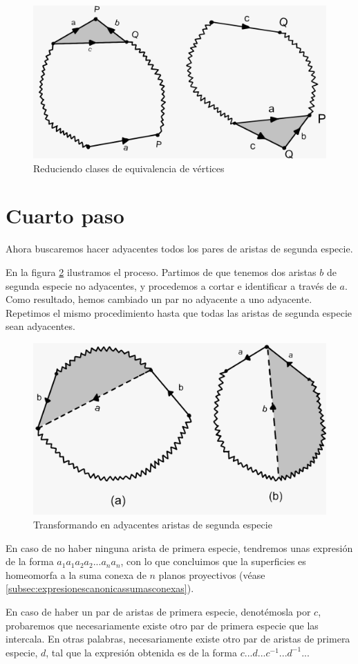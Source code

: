 \documentclass[a4paper,11pt,spanish, twoside, leqno]{tfg-uam}
\theoremstyle{definition}
\begin{document}
\begin{figure}[h!]
	\centering
	\includegraphics[width=0.4\linewidth]{imagenes/paso3.jpeg}
	\caption{Reduciendo clases de equivalencia de vértices}
	\label{fig:paso3}
\end{figure}


\section{Cuarto paso}

Ahora buscaremos hacer adyacentes todos los pares de aristas de segunda especie.

En la figura \ref{fig:paso4} ilustramos el proceso. Partimos de que tenemos dos aristas $b$ de segunda especie no adyacentes, y procedemos a cortar e identificar a través de $a$. Como resultado, hemos cambiado un par no adyacente a uno adyacente. Repetimos el mismo procedimiento hasta que todas las aristas de segunda especie sean adyacentes.

\begin{figure}[h!]
	\centering
	\includegraphics[width=0.4\linewidth]{imagenes/paso4.jpeg}
	\caption{Transformando en adyacentes aristas de segunda especie}
	\label{fig:paso4}
\end{figure}

En caso de no haber ninguna arista de primera especie, tendremos unas expresión de la forma $a_1a_1a_2a_2...a_na_n$, con lo que concluimos que la superficies es homeomorfa a la suma conexa de $n$ planos proyectivos (véase \ref{subsec:expresionescanonicassumasconexas}).

En caso de haber un par de  aristas de primera especie, denotémosla por $c$, probaremos que necesariamente existe otro par de primera especie que las intercala. En otras palabras, necesariamente existe otro par de aristas de primera especie, $d$, tal que la expresión obtenida es de la forma $c...d...c^{-1}...d^{-1}...$
\end{document}
